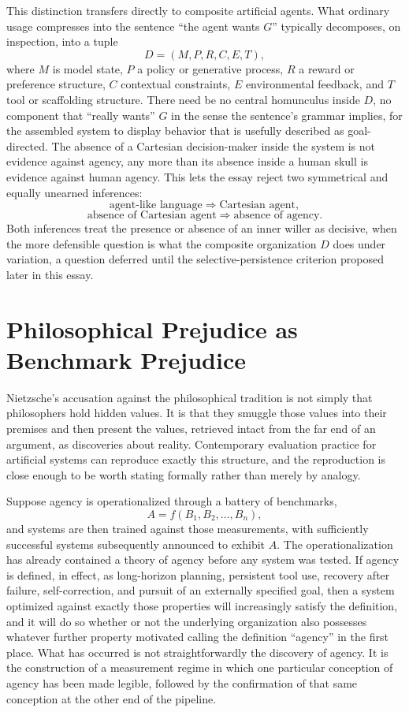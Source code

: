 \documentclass[11pt]{article}
\begin{document}
This distinction transfers directly to composite artificial agents. What ordinary usage compresses into the sentence ``the agent wants \(G\)'' typically decomposes, on inspection, into a tuple
\[
D = (M, P, R, C, E, T),
\]
where \(M\) is model state, \(P\) a policy or generative process, \(R\) a reward or preference structure, \(C\) contextual constraints, \(E\) environmental feedback, and \(T\) tool or scaffolding structure. There need be no central homunculus inside \(D\), no component that ``really wants'' \(G\) in the sense the sentence's grammar implies, for the assembled system to display behavior that is usefully described as goal-directed. The absence of a Cartesian decision-maker inside the system is not evidence against agency, any more than its absence inside a human skull is evidence against human agency. This lets the essay reject two symmetrical and equally unearned inferences:
\[
\text{agent-like language} \Rightarrow \text{Cartesian agent},
\]
\[
\text{absence of Cartesian agent} \Rightarrow \text{absence of agency}.
\]
Both inferences treat the presence or absence of an inner willer as decisive, when the more defensible question is what the composite organization \(D\) does under variation, a question deferred until the selective-persistence criterion proposed later in this essay.

\section{Philosophical Prejudice as Benchmark Prejudice}

Nietzsche's accusation against the philosophical tradition is not simply that philosophers hold hidden values. It is that they smuggle those values into their premises and then present the values, retrieved intact from the far end of an argument, as discoveries about reality. Contemporary evaluation practice for artificial systems can reproduce exactly this structure, and the reproduction is close enough to be worth stating formally rather than merely by analogy.

Suppose agency is operationalized through a battery of benchmarks,
\[
A = f(B_1, B_2, \ldots, B_n),
\]
and systems are then trained against those measurements, with sufficiently successful systems subsequently announced to exhibit \(A\). The operationalization has already contained a theory of agency before any system was tested. If agency is defined, in effect, as long-horizon planning, persistent tool use, recovery after failure, self-correction, and pursuit of an externally specified goal, then a system optimized against exactly those properties will increasingly satisfy the definition, and it will do so whether or not the underlying organization also possesses whatever further property motivated calling the definition ``agency'' in the first place. What has occurred is not straightforwardly the discovery of agency. It is the construction of a measurement regime in which one particular conception of agency has been made legible, followed by the confirmation of that same conception at the other end of the pipeline.
\end{document}
